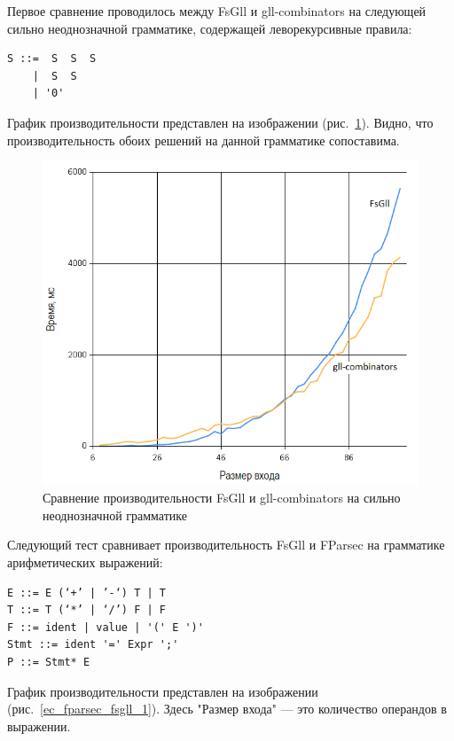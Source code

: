 \documentclass[14pt]{matmex-diploma}
\begin{document}
Первое сравнение проводилось между FsGll и gll-combinators на следующей 
сильно неоднозначной грамматике, содержащей леворекурсивные правила: 
\begin{lstlisting}
S ::=  S  S  S 
    |  S  S 
    | '0'
\end{lstlisting}

График производительности представлен на изображении (рис.~\ref{nnn_scala_fsgll}).
Видно, что производительность обоих решений на данной грамматике сопоставима. 

\begin{figure}[!h]
  \label{nnn_scala_fsgll}
  \centering
  \includegraphics[width=15cm]{pics/graph1.png}
  \caption{Сравнение производительности FsGll и gll-combinators на сильно неоднозначной грамматике}
\end{figure}
\FloatBarrier




Следующий тест сравнивает производительность  FsGll и FParsec на грамматике арифметических выражений:
\begin{lstlisting}
E ::= E (‘+’ | ’-‘) T | T
T ::= T (‘*’ | ‘/’) F | F
F ::= ident | value | '(' E ')'
Stmt ::= ident '=' Expr ';'
P ::= Stmt* E
\end{lstlisting}

График производительности представлен на изображении (рис.~\ref{ec_fparsec_fsgll_1}). 
Здесь "Размер входа" --- это количество операндов в выражении.
\end{document}
